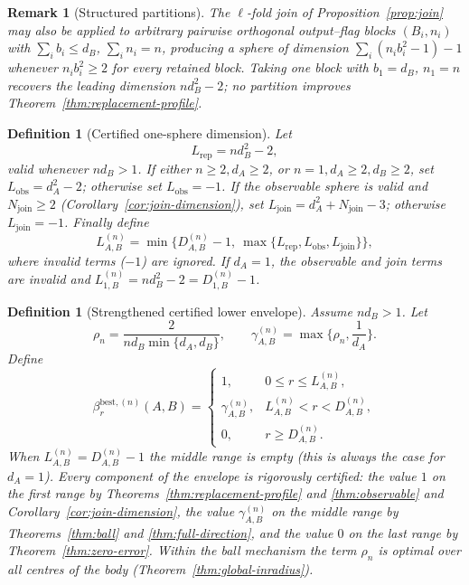 \documentclass[11pt,a4paper]{article}
\newtheorem{definition}[theorem]{Definition}
\newtheorem{remark}[theorem]{Remark}
\begin{document}
\begin{remark}[Structured partitions]
\label{rem:partitions}
The $\ell$-fold join of Proposition~\ref{prop:join} may also be applied to arbitrary pairwise orthogonal output--flag blocks $(B_i,n_i)$ with $\sum_ib_i\le d_B$, $\sum_in_i=n$, producing a sphere of dimension $\sum_i(n_ib_i^2-1)-1$ whenever $n_ib_i^2\ge2$ for every retained block. Taking one block with $b_1=d_B$, $n_1=n$ recovers the leading dimension $nd_B^2-2$; no partition improves Theorem~\ref{thm:replacement-profile}.
\end{remark}

\begin{definition}[Certified one-sphere dimension]
\label{def:one-sphere}
Let
\[
L_{\mathrm{rep}}=nd_B^2-2,
\]
valid whenever $nd_B>1$. If either $n\ge2,d_A\ge2$, or $n=1,d_A\ge2,d_B\ge2$, set $L_{\mathrm{obs}}=d_A^2-2$; otherwise set $L_{\mathrm{obs}}=-1$. If the observable sphere is valid and $N_{\mathrm{join}}\ge2$ (Corollary~\ref{cor:join-dimension}), set $L_{\mathrm{join}}=d_A^2+N_{\mathrm{join}}-3$; otherwise $L_{\mathrm{join}}=-1$. Finally define
\[
L_{A,B}^{(n)}
=\min\Big\{D_{A,B}^{(n)}-1,\ \max\{L_{\mathrm{rep}},L_{\mathrm{obs}},L_{\mathrm{join}}\}\Big\},
\]
where invalid terms ($-1$) are ignored. If $d_A=1$, the observable and join terms are invalid and $L_{1,B}^{(n)}=nd_B^2-2=D_{1,B}^{(n)}-1$.
\end{definition}

\begin{definition}[Strengthened certified lower envelope]
\label{def:beta-best}
Assume $nd_B>1$. Let
\[
\rho_n=\frac{2}{nd_B\min\{d_A,d_B\}},\qquad
\gamma_{A,B}^{(n)}=\max\Big\{\rho_n,\frac1{d_A}\Big\}.
\]
Define
\[
\beta_r^{\mathrm{best},(n)}(A,B)=
\begin{cases}
1,&0\le r\le L_{A,B}^{(n)},\\[3pt]
\gamma_{A,B}^{(n)},&L_{A,B}^{(n)}<r<D_{A,B}^{(n)},\\[6pt]
0,&r\ge D_{A,B}^{(n)}.
\end{cases}
\]
When $L_{A,B}^{(n)}=D_{A,B}^{(n)}-1$ the middle range is empty (this is always the case for $d_A=1$). Every component of the envelope is rigorously certified: the value $1$ on the first range by Theorems~\ref{thm:replacement-profile} and \ref{thm:observable} and Corollary~\ref{cor:join-dimension}, the value $\gamma_{A,B}^{(n)}$ on the middle range by Theorems~\ref{thm:ball} and \ref{thm:full-direction}, and the value $0$ on the last range by Theorem~\ref{thm:zero-error}. Within the ball mechanism the term $\rho_n$ is optimal over all centres of the body (Theorem~\ref{thm:global-inradius}).
\end{definition}
\end{document}

